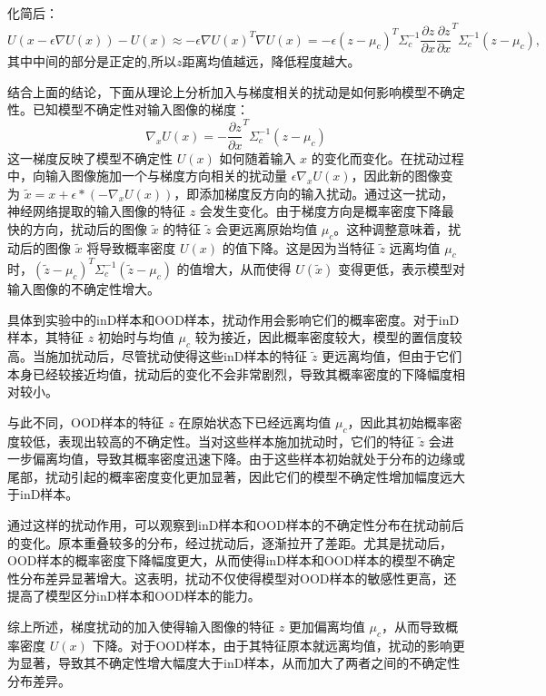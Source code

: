 化简后：
\[
U(x-\epsilon \nabla U(x)) - U(x) \approx
-\epsilon\nabla U(x)^T \nabla U(x) = -\epsilon\left( z - \mu_c \right)^T \Sigma_c^{-1} \frac{\partial z}{\partial x} \frac{\partial z}{\partial x}^T \Sigma_c^{-1} \left( z - \mu_c \right),
\]
其中中间的部分是正定的,所以$z$距离均值越远，降低程度越大。

结合上面的结论，下面从理论上分析加入与梯度相关的扰动是如何影响模型不确定性。已知模型不确定性对输入图像的梯度：
\[
\nabla_x U(x) = - \frac{\partial z}{\partial x}^T \Sigma_c^{-1} (z - \mu_c)
\]
这一梯度反映了模型不确定性 \( U(x) \) 如何随着输入 \( x \) 的变化而变化。在扰动过程中，向输入图像施加一个与梯度方向相关的扰动量 \( \epsilon \nabla_x U(x) \)，因此新的图像变为  $\tilde{x}=x+\epsilon* (-\nabla_x U(x))$，即添加梯度反方向的输入扰动。通过这一扰动，神经网络提取的输入图像的特征 \( z \) 会发生变化。由于梯度方向是概率密度下降最快的方向，扰动后的图像 \( \tilde{x}\) 的特征 \( \tilde{z} \) 会更远离原始均值 \( \mu_c \)。这种调整意味着，扰动后的图像 \( \tilde{x}\) 将导致概率密度 \( U(x) \) 的值下降。这是因为当特征 \( \tilde{z} \) 远离均值 \( \mu_c \) 时，\( (\tilde{z} - \mu_c)^T \Sigma_c^{-1} (\tilde{z} - \mu_c) \) 的值增大，从而使得 \( U(\tilde{x}) \) 变得更低，表示模型对输入图像的不确定性增大。

具体到实验中的inD样本和OOD样本，扰动作用会影响它们的概率密度。对于inD样本，其特征 \( z \) 初始时与均值 \( \mu_c \) 较为接近，因此概率密度较大，模型的置信度较高。当施加扰动后，尽管扰动使得这些inD样本的特征 \( \tilde{z} \) 更远离均值，但由于它们本身已经较接近均值，扰动后的变化不会非常剧烈，导致其概率密度的下降幅度相对较小。

与此不同，OOD样本的特征 \( z \) 在原始状态下已经远离均值 \( \mu_c \)，因此其初始概率密度较低，表现出较高的不确定性。当对这些样本施加扰动时，它们的特征 \( \tilde{z} \) 会进一步偏离均值，导致其概率密度迅速下降。由于这些样本初始就处于分布的边缘或尾部，扰动引起的概率密度变化更加显著，因此它们的模型不确定性增加幅度远大于inD样本。

通过这样的扰动作用，可以观察到inD样本和OOD样本的不确定性分布在扰动前后的变化。原本重叠较多的分布，经过扰动后，逐渐拉开了差距。尤其是扰动后，OOD样本的概率密度下降幅度更大，从而使得inD样本和OOD样本的模型不确定性分布差异显著增大。这表明，扰动不仅使得模型对OOD样本的敏感性更高，还提高了模型区分inD样本和OOD样本的能力。

综上所述，梯度扰动的加入使得输入图像的特征 \( z \) 更加偏离均值 \( \mu_c \)，从而导致概率密度 \( U(x) \) 下降。对于OOD样本，由于其特征原本就远离均值，扰动的影响更为显著，导致其不确定性增大幅度大于inD样本，从而加大了两者之间的不确定性分布差异。




